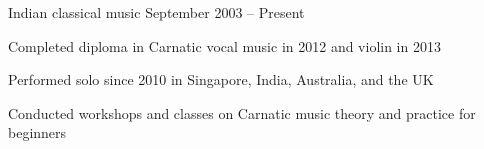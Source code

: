 \begin{cventries}
	{Indian classical music} %
	{} %
	{September 2003 -- Present} %
	{
		\begin{cvitems} %
			\item Completed diploma in Carnatic vocal music in 2012 and violin in 2013
			\item Performed solo since 2010 in Singapore, India, Australia, and the UK
			\item Conducted workshops and classes on Carnatic music theory and practice for beginners
		\end{cvitems}
	}


\end{cventries}
